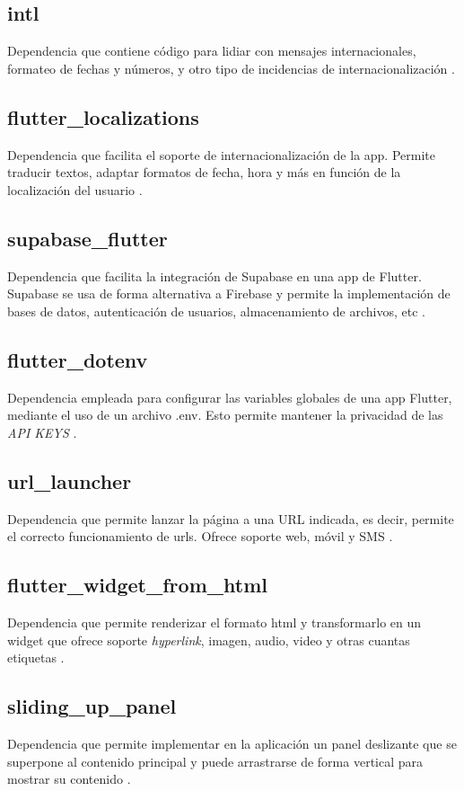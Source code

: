 \subsection{intl}
Dependencia que contiene código para lidiar con mensajes internacionales, formateo de fechas y números, y otro tipo de incidencias de internacionalización \cite{intl}.
\subsection{flutter\_localizations}
Dependencia que facilita el soporte de internacionalización de la app. Permite traducir textos, adaptar formatos de fecha, hora y más en función de la localización del usuario \cite{flutter_localizations}.
\subsection{supabase\_flutter}
Dependencia que facilita la integración de Supabase en una app de Flutter. Supabase se usa de forma alternativa a Firebase y permite la implementación de bases de datos, autenticación de usuarios, almacenamiento de archivos, etc \cite{supabase}.
\subsection{flutter\_dotenv}
Dependencia empleada para configurar las variables globales de una app Flutter, mediante el uso de un archivo .env. Esto permite mantener la privacidad de las \textit{API KEYS} \cite{dot_env}.
\subsection{url\_launcher}
Dependencia que permite lanzar la página a una URL indicada, es decir, permite el correcto funcionamiento de urls. Ofrece soporte web, móvil y SMS \cite{url_launcher}.
\subsection{flutter\_widget\_from\_html}
Dependencia que permite renderizar el formato html y transformarlo en un widget que ofrece soporte \textit{hyperlink}, imagen, audio, video y otras cuantas etiquetas \cite{widget_from_html}.
\subsection{sliding\_up\_panel}
Dependencia que permite implementar en la aplicación un panel deslizante que se superpone al contenido principal y puede arrastrarse de forma vertical para mostrar su contenido \cite{sliding}.

